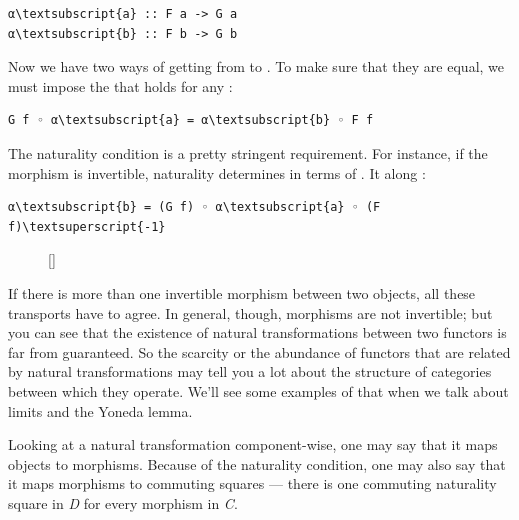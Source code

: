 \begin{Verbatim}[commandchars=\\\{\}]
α\textsubscript{a} :: F a -> G a
α\textsubscript{b} :: F b -> G b
\end{Verbatim}
Now we have two ways of getting from  to . To
make sure that they are equal, we must impose the  that holds for any :

\begin{Verbatim}[commandchars=\\\{\}]
G f ◦ α\textsubscript{a} = α\textsubscript{b} ◦ F f
\end{Verbatim}
The naturality condition is a pretty stringent requirement. For
instance, if the morphism  is invertible, naturality
determines  in terms of . It 
 along :

\begin{Verbatim}[commandchars=\\\{\}]
α\textsubscript{b} = (G f) ◦ α\textsubscript{a} ◦ (F f)\textsuperscript{-1}
\end{Verbatim}

\begin{figure}
\raisebox{0pt}[\dimexpr{}\baselineskip\relax]{
}%
\end{figure}

\noindent
If there is more than one invertible morphism between two objects, all
these transports have to agree. In general, though, morphisms are not
invertible; but you can see that the existence of natural
transformations between two functors is far from guaranteed. So the
scarcity or the abundance of functors that are related by natural
transformations may tell you a lot about the structure of categories
between which they operate. We'll see some examples of that when we talk
about limits and the Yoneda lemma.

Looking at a natural transformation component-wise, one may say that it
maps objects to morphisms. Because of the naturality condition, one may
also say that it maps morphisms to commuting squares --- there is one
commuting naturality square in \emph{D} for every morphism in \emph{C}.

